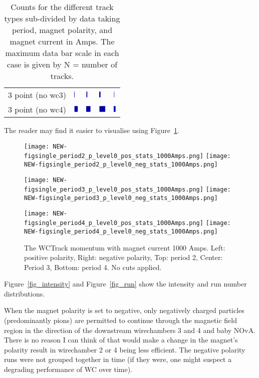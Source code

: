 \begin{table}[h]
\begin{subtable}[t]{0.48\textwidth}
\begin{tabular}{lllll}
			3 point (no wc3) & $\mybarb{0.026944444444444444}$ & $\mybarb{0.0525}$ & $\mybarb{0.06444444444444444}$ & $\mybarb{0.0175}$ \\
			3 point (no wc4) & $\mybarb{0.16416666666666666}$ & $\mybarb{0.20527777777777778}$ & $\mybarb{0.29638888888888887}$ & $\mybarb{0.09722222222222222}$ \\
			\bottomrule
		\end{tabular}
		\label{tab_p4_neg}
	\end{subtable}
	\caption[]{Counts for the different track types sub-divided by data taking period, magnet polarity, and magnet current in Amps. The maximum data bar scale in each case is given by N = number of tracks.}
	\label{tab_counts}
\end{table}

  
The reader may find it easier to visualise using Figure~\ref{fig_momentum}.

  \begin{figure}[h]
    \centering   
     	\texttt{[image: NEW-figsingle\_period2\_p\_level0\_pos\_stats\_1000Amps.png]}
	 \texttt{[image: NEW-figsingle\_period2\_p\_level0\_neg\_stats\_1000Amps.png]}
	 
   	\texttt{[image: NEW-figsingle\_period3\_p\_level0\_pos\_stats\_1000Amps.png]}
	 \texttt{[image: NEW-figsingle\_period3\_p\_level0\_neg\_stats\_1000Amps.png]}
	 
 	\texttt{[image: NEW-figsingle\_period4\_p\_level0\_pos\_stats\_1000Amps.png]}
	 \texttt{[image: NEW-figsingle\_period4\_p\_level0\_neg\_stats\_1000Amps.png]}
   \caption[short]{The WCTrack momentum with magnet current 1000 Amps. Left: positive polarity, Right: negative polarity, Top: period 2, Center: Period 3, Bottom: period 4. No cuts applied.}
   \label{fig_momentum}
  \end{figure}
 
 
 Figure~\ref{fig_intensity} and  Figure~\ref{fig_run} show the intensity and run number distributions.
  
When the magnet polarity is set to negative, only negatively charged particles (predominantly pions) are permitted to continue through the magnetic field region in the direction of the downstream wirechambers 3 and 4 and baby NOvA. There is no reason I can think of that would make a change in the magnet's polarity result in wirechamber 2 or 4 being less efficient. The negative polarity runs were not grouped together in time (if they were, one might suspect a degrading performance of WC over time).


